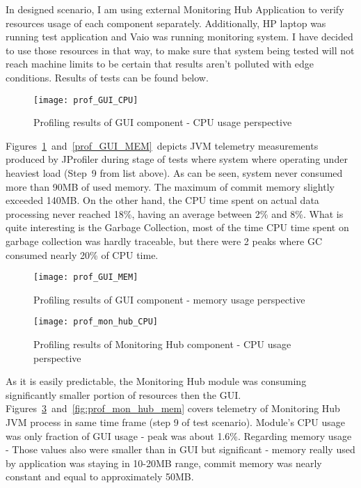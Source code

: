In designed scenario, I am using external Monitoring Hub Application to verify resources usage of each component separately. Additionally, HP laptop was running test application and Vaio was running monitoring system. I have decided to use those resources in that way, to make sure that system being tested will not reach machine limits to be certain that results aren\rq{}t polluted with edge conditions. Results of tests can be found below.

\begin{figure}[ht]
\centering
\texttt{[image: prof\_GUI\_CPU]}
\caption{Profiling results of GUI component - CPU usage perspective}
\label{fig:prof_GUI_CPU}
\end{figure}

Figures~\ref{fig:prof_GUI_CPU}~and~\ref{prof_GUI_MEM}~depicts JVM telemetry measurements produced by JProfiler during stage of tests where system where operating under heaviest load (Step~9 from list above). As can be seen, system never consumed more than 90MB of used memory. The maximum of commit memory slightly exceeded 140MB. On the other hand, the CPU time spent on actual data processing never reached 18\%, having an average between 2\% and 8\%. What is quite interesting is the Garbage Collection, most of the time CPU time spent on garbage collection was hardly traceable, but there were 2 peaks where GC consumed nearly 20\% of CPU time. 

\begin{figure}[ht]
\centering
\texttt{[image: prof\_GUI\_MEM]}
\caption{Profiling results of GUI component - memory usage perspective}
\label{fig:prof_GUI_MEM}
\end{figure}
\begin{figure}[ht]
\centering
\texttt{[image: prof\_mon\_hub\_CPU]}
\caption{Profiling results of Monitoring Hub component - CPU usage perspective}
\label{fig:prof_mon_hub_CPU}
\end{figure}

As it is easily predictable, the Monitoring Hub module was consuming significantly smaller portion of resources then the GUI. Figures~\ref{fig:prof_mon_hub_CPU}~and~\ref{fig:prof_mon_hub_mem} covers telemetry of Monitoring Hub JVM process in same time frame (step 9 of test scenario). Module\rq{}s CPU usage was only fraction of GUI usage - peak was about 1.6\%. Regarding memory usage - Those values also were smaller than in GUI but significant - memory really used by application was staying in 10-20MB range, commit memory was nearly constant and equal to approximately 50MB.

